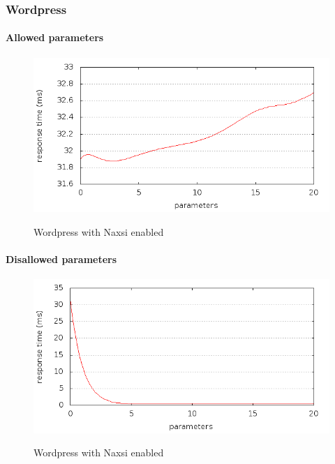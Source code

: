 \documentclass[Measurements]{subfiles}
\begin{document}
\subsubsection{Wordpress}

\paragraph{Allowed parameters}
\begin{figure}[H]
\caption{Wordpress with Naxsi enabled}
\centering
\includegraphics[scale=0.55] {images/results/wp_with_naxsi_incremented_allowed_parameters/output.png}
\label{fig:Baseline performance measurement}
\end{figure}

\paragraph{Disallowed parameters}
\begin{figure}[H]
\caption{Wordpress with Naxsi enabled}
\centering
\includegraphics[scale=0.55] {images/results/wp_with_naxsi_incremented_disallowed_parameters/output.png}
\label{fig:Baseline performance measurement}
\end{figure}
\end{document}
